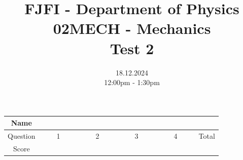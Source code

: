 \documentclass[a4paper,12pt]{article}
\title{{\Large FJFI - Department of Physics} \\ 
                  02MECH - Mechanics \\ 
          {\Large \textbf{Test 2}}\vspace{-1cm}}
\date{18.12.2024 \\ 12:00pm - 1:30pm}
\author{}
\begin{document}
\maketitle
\vspace{-1.5em}

\begin{center}
    \renewcommand{\arraystretch}{2}
    \begin{tabular}{ |c|c|c|c|c|c| } 
        \hline
        Name& \multicolumn{5}{c|}{\phantom{~~~~~~~~~~~~~~~~~~~~~~~~~~~~~~~~~~~~~~~~~~~~~~~~~~~~~~~~~~~~~~~~~~~~~~~~~~~~~~~}}\\
        \hline
        Question & ~~~~1~~~~ & ~~~~2~~~~ & ~~~~3~~~~ & ~~~~4~~~~ & Total \\ 
        \hline
        Score & &  & & & \\
        \hline
    \end{tabular}
\end{center}

\vspace*{1cm}







\end{document}
